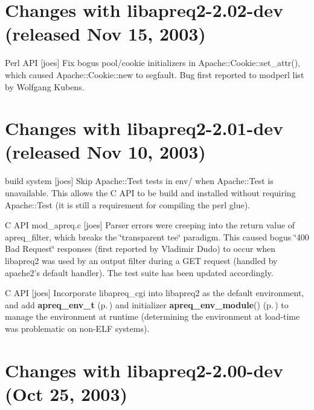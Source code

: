 \section{Changes with libapreq2-2.02-dev (released Nov 15, 2003)}\label{v2_02_dev}


\begin{CompactItemize}
\item 
Perl API [joes] Fix bogus pool/cookie initializers in Apache::Cookie::set\_\-attr(), which caused Apache::Cookie::new to segfault. Bug first reported to modperl list by Wolfgang Kubens.\end{CompactItemize}
\section{Changes with libapreq2-2.01-dev (released Nov 10, 2003)}\label{v2_01_dev}


\begin{CompactItemize}
\item 
build system [joes] Skip Apache::Test tests in env/ when Apache::Test is unavailable. This allows the C API to be build and installed without requiring Apache::Test (it is still a requirement for compiling the perl glue).\end{CompactItemize}
\begin{CompactItemize}
\item 
C API mod\_\-apreq.c [joes] Parser errors were creeping into the return value of apreq\_\-filter, which breaks the \char`\"{}transparent tee\char`\"{} paradigm. This caused bogus \char`\"{}400 Bad Request\char`\"{} responses (first reported by Vladimir Dudo)  to occur when libapreq2 was used by an output filter during a GET  request (handled by apache2's default handler). The test suite  has been updated accordingly.\end{CompactItemize}
\begin{CompactItemize}
\item 
C API [joes] Incorporate libapreq\_\-cgi into libapreq2 as the default environment, and add {\bf apreq\_\-env\_\-t} {\rm (p.\,\pageref{structapreq__env__t})} and initializer {\bf apreq\_\-env\_\-module}() {\rm (p.\,\pageref{group__ENV_a12})} to manage the environment at runtime (determining the environment at load-time was problematic on non-ELF systems).\end{CompactItemize}
\section{Changes with libapreq2-2.00-dev (Oct 25, 2003)}\label{v2_0_0}



